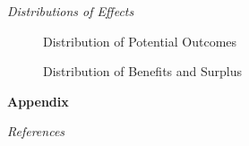 \begin{frame}\begin{center}
\LARGE\textit{Distributions of Effects}
\end{center}\end{frame}
\begin{frame}
\begin{figure}\caption{Distribution of Potential Outcomes}
\end{figure}
\end{frame}

\begin{frame}
\begin{figure}\caption{Distribution of Benefits and Surplus}
\end{figure}
\end{frame}


\beginbackup\appendix
\begin{frame}\begin{center}
\LARGE\textbf{Appendix}
\end{center}\end{frame}

\begin{frame}\begin{center}
\LARGE\textit{References}
\end{center}\end{frame}
\begin{frame}[allowframebreaks]\frametitle{}

\nocite{Carneiro.2011, Heckman.1990c, Heckman.2010h}





\end{frame}

\backupend

